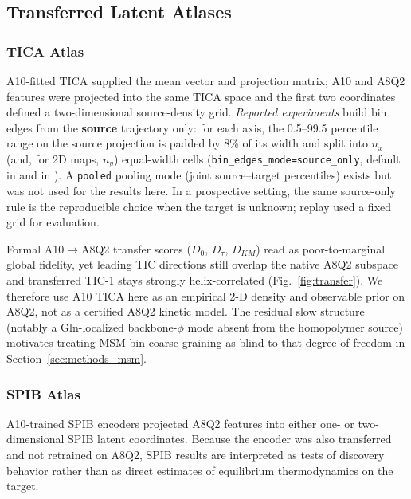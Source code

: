 \documentclass[journal=jctcce,manuscript=article,layout=twocolumn]{achemso}
\begin{document}
\subsection{Transferred Latent Atlases}

\subsubsection{TICA Atlas}
\label{sec:tica_atlas}

A10-fitted TICA supplied the mean vector and projection matrix; A10 and A8Q2 features were projected into the same TICA space and the first two coordinates defined a two-dimensional source-density grid. \emph{Reported experiments} build bin edges from the \textbf{source} trajectory only: for each axis, the 0.5--99.5 percentile range on the source projection is padded by 8\% of its width and split into $n_x$ (and, for 2D maps, $n_y$) equal-width cells (\texttt{bin\_edges\_mode=source\_only}, default in  and in ). A \texttt{pooled} pooling mode (joint source--target percentiles) exists but was not used for the results here. In a prospective setting, the same source-only rule is the reproducible choice when the target is unknown; replay used a fixed grid for evaluation.

Formal A10$\rightarrow$A8Q2 transfer scores ($D_0$, $D_{\tau}$, $D_{KM}$) read as poor-to-marginal global fidelity, yet leading TIC directions still overlap the native A8Q2 subspace and transferred TIC-1 stays strongly helix-correlated (Fig.~\ref{fig:transfer}). We therefore use A10 TICA here as an empirical 2-D density and observable prior on A8Q2, not as a certified A8Q2 kinetic model. The residual slow structure (notably a Gln-localized backbone-$\phi$ mode absent from the homopolymer source) motivates treating MSM-bin coarse-graining as blind to that degree of freedom in Section~\ref{sec:methods_msm}.

\subsubsection{SPIB Atlas}

A10-trained SPIB encoders projected A8Q2 features into either one- or two-dimensional SPIB latent coordinates.\cite{wang2021spib} Because the encoder was also transferred and not retrained on A8Q2, SPIB results are interpreted as tests of discovery behavior rather than as direct estimates of equilibrium thermodynamics on the target.
\end{document}
